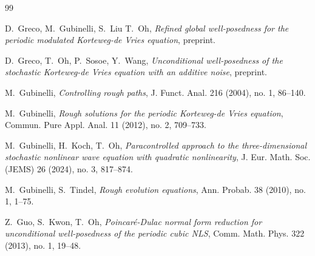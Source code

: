 \documentclass[letterpaper, 11pt,  reqno]{amsart}
\newcommand{\1}{\hspace{0.5mm}\text{I}\hspace{0.5mm}}
\numberwithin{equation}{section}
\numberwithin{theorem}{section}
\begin{document}
\begin{thebibliography}{99}


D.~Greco, 
M.~Gubinelli, S.~Liu
T.~Oh, 
{\it Refined global well-posedness for the periodic modulated Korteweg-de Vries equation},
preprint.

D.~Greco, T.~Oh, P.~Sosoe, Y.~Wang, 
{\it Unconditional well-posedness of the stochastic Korteweg-de Vries equation with an additive noise},
preprint.




%


M.~Gubinelli,
{\it Controlling rough paths},
J. Funct. Anal. 216 (2004), no. 1, 86--140.



M.~Gubinelli, 
{\it Rough solutions for the periodic Korteweg-de Vries equation},
Commun. Pure Appl. Anal. 11 (2012), no. 2, 709--733.






%
%
%

M.~Gubinelli, H.~Koch, T.~Oh, 
{\it  Paracontrolled approach to the three-dimensional stochastic nonlinear wave equation with quadratic nonlinearity},  
J. Eur. Math. Soc. (JEMS) 26 (2024), no. 3, 817--874. 



M.~Gubinelli, S.~Tindel,
{\it Rough evolution equations},
Ann. Probab. 38 (2010), no. 1, 1--75.




Z.~Guo, S.~Kwon, T.~Oh, 
{\it Poincar\'e-Dulac normal form reduction for unconditional well-posedness of
the periodic cubic NLS}, Comm. Math. Phys. 322 (2013), no. 1, 19--48.



\end{thebibliography}
\end{document}
